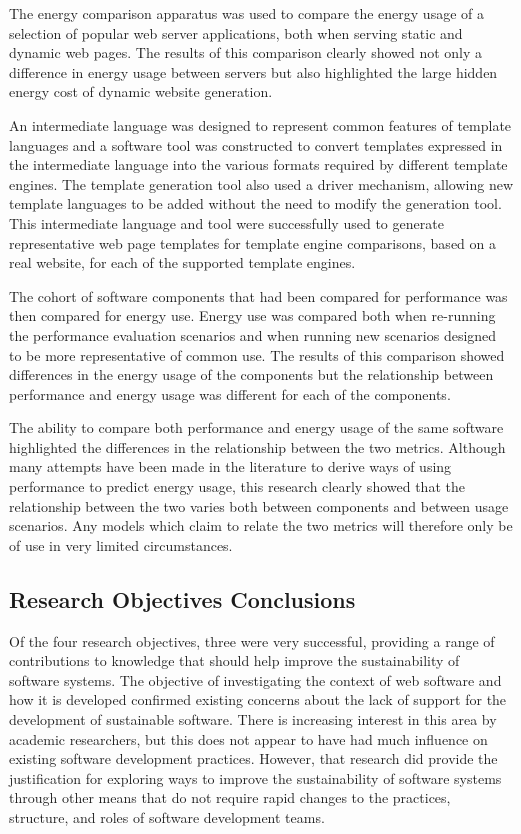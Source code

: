 The energy comparison apparatus was used to compare the energy usage of a selection of popular web server applications, both when serving static and dynamic web pages. The results of this comparison clearly showed not only a difference in energy usage between servers but also highlighted the large hidden energy cost of dynamic website generation.

An intermediate language was designed to represent common features of \gls{template language}s and a software tool was constructed to convert templates expressed in the intermediate language into the various formats required by different \gls{template engine}s. The template generation tool also used a driver mechanism, allowing new \gls{template language}s to be added without the need to modify the generation tool. This intermediate language and tool were successfully used to generate representative web page templates for \gls{template engine} comparisons, based on a real website, for each of the supported \gls{template engine}s.

The cohort of software components that had been compared for performance was then compared for energy use. Energy use was compared both when re-running the performance evaluation scenarios and when running new scenarios designed to be more representative of common use. The results of this comparison showed differences in the energy usage of the components but the relationship between performance and energy usage was different for each of the components.

The ability to compare both performance and energy usage of the same software highlighted the differences in the relationship between the two metrics. Although many attempts have been made in the literature to derive ways of using performance to predict energy usage, this research clearly showed that the relationship between the two varies both between components and between usage scenarios. Any models which claim to relate the two metrics will therefore only be of use in very limited circumstances.


\subsection{Research Objectives Conclusions}

Of the four research objectives, three were very successful, providing a range of contributions to knowledge that should help improve the sustainability of software systems. The objective of investigating the context of web software and how it is developed confirmed existing concerns about the lack of support for the development of sustainable software. There is increasing interest in this area by academic researchers, but this does not appear to have had much influence on existing software development practices. However, that research did provide the justification for exploring ways to improve the sustainability of software systems through other means that do not require rapid changes to the practices, structure, and roles of software development teams.


